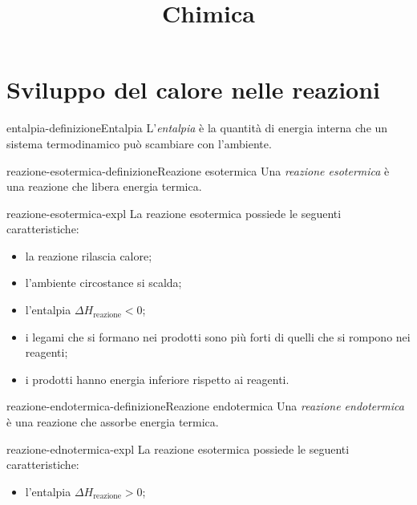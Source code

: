 \documentclass[preview]{standalone}
\begin{document}
\title{Chimica}
\genpage

\section{Sviluppo del calore nelle reazioni}



\begin{snippetdefinition}{entalpia-definizione}{Entalpia}
    L'\textit{entalpia} è la quantità di energia interna che un sistema
    termodinamico può scambiare con l'ambiente.
\end{snippetdefinition}

\begin{snippetdefinition}{reazione-esotermica-definizione}{Reazione esotermica}
    Una \textit{reazione esotermica} è una reazione che libera energia termica.
\end{snippetdefinition}

\begin{snippet}{reazione-esotermica-expl}
    La reazione esotermica possiede le seguenti caratteristiche:
    \begin{itemize}
        \item la reazione rilascia calore;
        \item l'ambiente circostance si scalda;
        \item l'entalpia \(\Delta H_{\text{reazione}} < 0\);
        \item i legami che si formano nei prodotti sono più forti di quelli che si rompono nei reagenti;
        \item i prodotti hanno energia inferiore rispetto ai reagenti.
    \end{itemize}
\end{snippet}

\begin{snippetdefinition}{reazione-endotermica-definizione}{Reazione endotermica}
    Una \textit{reazione endotermica} è una reazione che assorbe energia termica.
\end{snippetdefinition}

\begin{snippet}{reazione-ednotermica-expl}
    La reazione esotermica possiede le seguenti caratteristiche:
    \begin{itemize}
        \item l'entalpia \(\Delta H_{\text{reazione}} > 0\);
    \end{itemize}
\end{snippet}
\end{document}
